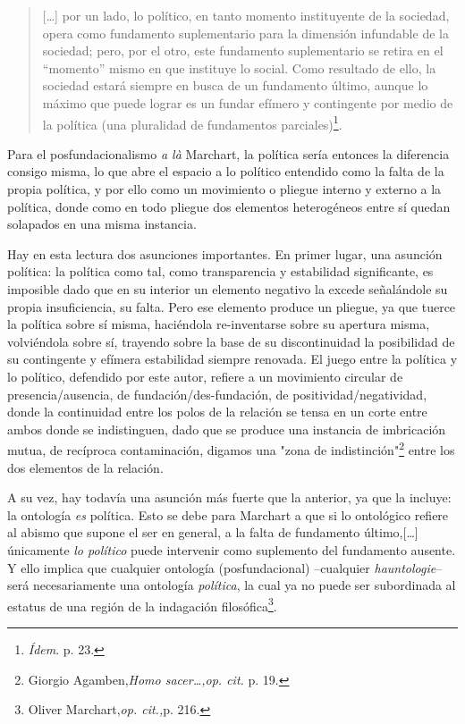 \documentclass{book}
\begin{document}
\begin{quote}
{[}\ldots{]} por un lado, lo político, en tanto momento instituyente de
la sociedad, opera como fundamento suplementario para la dimensión
infundable de la sociedad; pero, por el otro, este fundamento
suplementario se retira en el ``momento'' mismo en que instituye lo
social. Como resultado de ello, la sociedad estará siempre en busca de
un fundamento último, aunque lo máximo que puede lograr es un fundar
efímero y contingente por medio de la política (una pluralidad de
fundamentos parciales)\footnote{\emph{Ídem}. p. 23.}.
\end{quote}

Para el posfundacionalismo \emph{a là} Marchart, la política sería
entonces la diferencia consigo misma, lo que abre el espacio a lo
político entendido como la falta de la propia política, y por ello como
un movimiento o pliegue interno y externo a la política, donde como en
todo pliegue dos elementos heterogéneos entre sí quedan solapados en una
misma instancia.

Hay en esta lectura dos asunciones importantes. En primer lugar, una
asunción política: la política como tal, como transparencia y
estabilidad significante, es imposible dado que en su interior un
elemento negativo la excede señalándole su propia insuficiencia, su
falta. Pero ese elemento produce un pliegue, ya que tuerce la política
sobre sí misma, haciéndola re-inventarse sobre su apertura misma,
volviéndola sobre sí, trayendo sobre la base de su discontinuidad la
posibilidad de su contingente y efímera estabilidad siempre renovada. El
juego entre la política y lo político, defendido por este autor, refiere
a un movimiento circular de presencia/ausencia, de
fundación/des-fundación, de positividad/negatividad, donde la
continuidad entre los polos de la relación se tensa en un corte entre
ambos donde se indistinguen, dado que se produce una instancia de
imbricación mutua, de recíproca contaminación, digamos una "zona de
indistinción"\footnote{Giorgio Agamben,\emph{Homo sacer\ldots,op. cit.}
  p. 19.} entre los dos elementos de la relación.

A su vez, hay todavía una asunción más fuerte que la anterior, ya que la
incluye: la ontología \emph{es} política. Esto se debe para Marchart a
que si lo ontológico refiere al abismo que supone el ser en general, a
la falta de fundamento último,{[}\ldots{]} únicamente \emph{lo político}
puede intervenir como suplemento del fundamento ausente. Y ello implica
que cualquier ontología (posfundacional) --cualquier
\emph{hauntologie}-- será necesariamente una ontología \emph{política},
la cual ya no puede ser subordinada al estatus de una región de la
indagación filosófica\footnote{Oliver Marchart,\emph{op. cit.,}p. 216.}.
\end{document}
